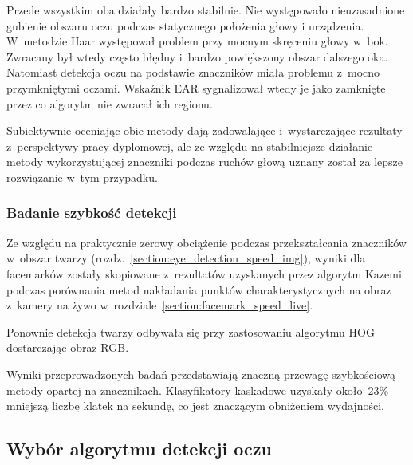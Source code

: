 \vspace{4mm}

Przede wszystkim oba działały bardzo stabilnie. Nie występowało nieuzasadnione gubienie obszaru oczu podczas statycznego położenia głowy i urządzenia. W~metodzie Haar występował problem przy mocnym skręceniu głowy w~bok. Zwracany był wtedy często błędny i~bardzo powiększony obszar dalszego oka. Natomiast detekcja oczu na podstawie znaczników miała problemu z~mocno przymkniętymi oczami. Wskaźnik EAR sygnalizował wtedy je jako zamknięte przez co algorytm nie zwracał ich regionu.

\par

Subiektywnie oceniając obie metody dają zadowalające i~wystarczające rezultaty z~perspektywy pracy dyplomowej, ale ze względu na stabilniejsze działanie metody wykorzystującej znaczniki podczas ruchów głową uznany został za lepsze rozwiązanie w~tym przypadku.


\subsubsection{Badanie szybkość detekcji} \label{section:eye_speed_live}

Ze względu na praktycznie zerowy obciążenie podczas przekształcania znaczników w~obszar twarzy (rozdz.~\hyperref[{section:eye_detection_speed_img}]{\ref{section:eye_detection_speed_img}}), wyniki dla facemarków zostały skopiowane z~rezultatów uzyskanych przez algorytm Kazemi podczas porównania metod nakładania punktów charakterystycznych na obraz z~kamery na żywo w~rozdziale~\hyperref[{section:facemark_speed_live}]{\ref{section:facemark_speed_live}}.

\par

Ponownie detekcja twarzy odbywała się przy zastosowaniu algorytmu HOG dostarczając obraz RGB.



Wyniki przeprowadzonych badań przedstawiają znaczną przewagę szybkościową metody opartej na znacznikach. Klasyfikatory kaskadowe uzyskały około~$23\%$ mniejszą liczbę klatek na sekundę, co jest znaczącym obniżeniem wydajności.



\subsection{Wybór algorytmu detekcji oczu}

